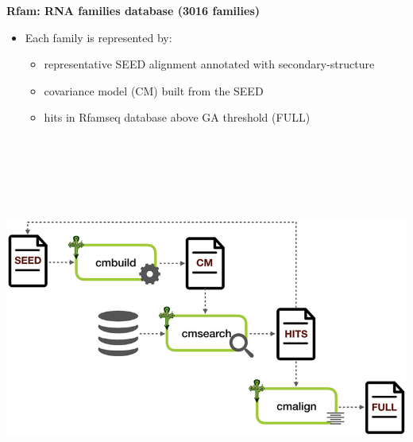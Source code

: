 \documentclass[landscape]{slides}
\begin{document}
\begin{slide}
\begin{center}
\textbf{Rfam: RNA families database (3016 families)}

\small
\begin{itemize}
\item Each family is represented by:
  \begin{itemize}
  \item representative SEED alignment annotated with secondary-structure
  \item covariance model (CM) built from the SEED
  \item hits in Rfamseq database above GA threshold (FULL)
  \end{itemize}
\end{itemize}

\vspace{0.5in}
\includegraphics[height=5in]{figs/kalvari18-rfam-schema}

\vfill
\tiny {}
\end{center}
\end{slide}
\end{document}
